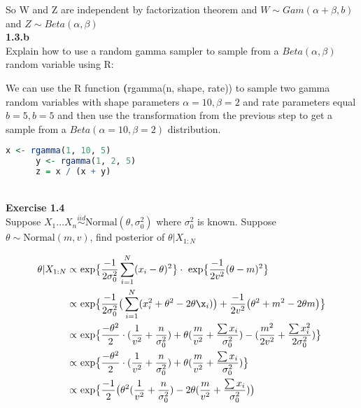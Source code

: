 \documentclass[12pt]{article}
\begin{document}
    So W and Z are independent by factorization theorem and \(W \sim Gam(\alpha + \beta, b)\) and
    \(Z \sim Beta(\alpha, \beta)\) \\

    \textbf{1.3.b} \\
    Explain how to use a random gamma sampler to sample from a \(Beta(\alpha, \beta)\) random variable
    using R:

    We can use the R function \textbf(rgamma(n, shape, rate)) to sample two gamma random variables
    with shape parameters \(\alpha = 10, \beta = 2\) and rate parameters equal \(b = 5, b= 5\) and then
    use the transformation from the previous step to get a sample from a \(Beta(\alpha = 10, \beta =2)\)
    distribution.

    \begin{lstlisting}[language=R]
      x <- rgamma(1, 10, 5)
      y <- rgamma(1, 2, 5)
      z = x / (x + y)
    \end{lstlisting} \\

    \noindent \textbf{Exercise 1.4} \\
    Suppose \(X_1 \dots X_n \stackrel{iid}{\sim} \text{Normal}(\theta, \sigma_0 ^2)\) where \(\sigma_0 ^2\)
    is known. Suppose \(\theta \sim \text{Normal}(m, v)\), find posterior of \(\theta | X_{1:N}\)

    \begin{align*}
      \theta | X_{1:N} \propto& \text{ exp}\big\{ \frac{-1}{2\sigma_0 ^2} \sum_{i=1}^{N} (x_i - \theta)^2 \big \}
         \cdot \text{ exp}\big\{ \frac{-1}{2v^2}(\theta - m)^2 \big \} \\
        \propto& \text{ exp} \big\{ \frac{-1}{2 \sigma_0 ^2} \big(\sum_{i=1}^N (x_i ^2 + \theta ^2 - 2 \theta \x_i)\big)
           + \frac{-1}{2 v^2} \big( \theta^2 + m^2 - 2 \theta m\big) \big \} \\
        \propto& \text{ exp} \big \{ \frac{-\theta ^2}{2} \cdot (\frac{1}{v^2} + \frac{n}{\sigma_0 ^2})
           + \theta (\frac{m}{v^2} + \frac{\sum x_i}{\sigma_0 ^2}) - (\frac{m^2}{2v^2}
           + \frac{\sum x_i^2}{2 \sigma_0 ^2}) \big \} \\
        \propto& \text{ exp} \big \{ \frac{-\theta ^2}{2} \cdot (\frac{1}{v^2} + \frac{n}{\sigma_0 ^2})
           + \theta (\frac{m}{v^2} + \frac{\sum x_i}{\sigma_0 ^2}) \big \} \\
        \propto& \text { exp} \big \{ \frac{-1}{2} \big(
               \theta ^2  (\frac{1}{v^2} + \frac{n}{\sigma_0 ^2})
               -  2 \theta (\frac{m}{v^2} + \frac{\sum x_i}{\sigma_0 ^2}) \big)
    \end{align*}
\end{document}
